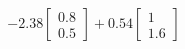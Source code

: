 \documentclass[preview]{standalone}
\begin{document}
\begin{align*}
-2.38 \begin{bmatrix} 0.8 \\ 0.5 \end{bmatrix} + 0.54 \begin{bmatrix} 1 \\ 1.6 \end{bmatrix}
\end{align*}
\end{document}
